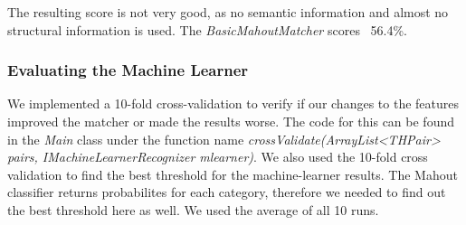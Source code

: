 The resulting score is not very good, as no semantic information and almost no structural information is used. The
\textit{BasicMahoutMatcher} scores ~56.4\%.

\subsubsection{Evaluating the Machine Learner}
We implemented a 10-fold cross-validation to verify if our changes to the features improved the matcher or made the
results worse. The code for this can be found in the \textit{Main} class under the function name
\textit{crossValidate(ArrayList<THPair> pairs, IMachineLearnerRecognizer mlearner)}. We also used the 10-fold cross
validation to find the best threshold for the machine-learner results. The Mahout classifier returns probabilites for
each category, therefore we needed to find out the best threshold here as well. We used the average of all 10 runs.



